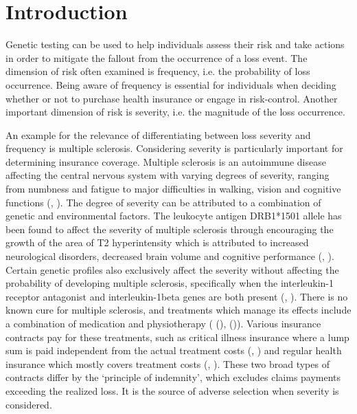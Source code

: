 \documentclass[nonatbib,preprint,12pt]{elsarticle}
\theoremstyle{plain}
\theoremstyle{definition}
\theoremstyle{plain}
\theoremstyle{TheoremNum}
\theoremstyle{CorollaryNum}
\theoremstyle{PropositionNum}
\theoremstyle{TheoremNum}
\begin{document}
\newpage
\section{Introduction}

Genetic testing can be used to help individuals assess their risk and take actions in order to mitigate the fallout from the occurrence of a loss event. The dimension of risk often examined is frequency, i.e. the probability of loss occurrence. Being aware of frequency is essential for individuals when deciding whether or not to purchase health insurance or engage in risk-control. Another important dimension of risk is severity, i.e. the magnitude of the loss occurrence. 

An example for the relevance of differentiating between loss severity and frequency is multiple sclerosis. Considering severity is particularly important for determining insurance coverage. Multiple sclerosis is an autoimmune disease affecting the central nervous system with varying degrees of severity, ranging from numbness and fatigue to major difficulties in walking, vision and cognitive functions (\citeauthor{ghasemi2017multiple}, \citeyear{ghasemi2017multiple}). The degree of severity can be attributed to a combination of genetic and environmental factors. The leukocyte antigen DRB1*1501 allele has been found to affect the severity of multiple sclerosis through encouraging the growth of the area of T2 hyperintensity which is attributed to increased neurological disorders, decreased brain volume and cognitive performance (\citeauthor{okuda2009genotype}, \citeyear{okuda2009genotype}). Certain genetic profiles also exclusively affect the severity without affecting the probability of developing multiple sclerosis, specifically when the interleukin-1 receptor antagonist and interleukin-1beta genes are both present (\citeauthor{schrijver1999association}, \citeyear{schrijver1999association}). There is no known cure for multiple sclerosis, and treatments which manage its effects include a combination of medication and physiotherapy (\citeauthor{ninds2015ms} (\citeyear{ninds2015ms}), \citeauthor*{cree2022new} (\citeyear{cree2022new})). Various insurance contracts pay for these treatments, such as critical illness insurance where a lump sum is paid  independent from the actual treatment costs (\citeauthor{abi2023criticalillness}, \citeyear{abi2023criticalillness}) and regular health insurance which mostly covers treatment costs (\citeauthor{boster2017comparative}, \citeyear{boster2017comparative}). These two broad types of contracts differ by the `principle of indemnity', which excludes claims payments exceeding the realized loss. It is the source of adverse selection when severity is considered. 
\end{document}
